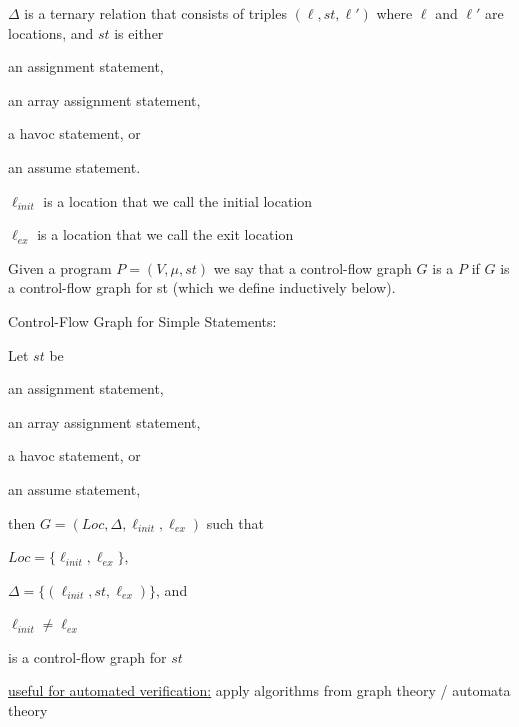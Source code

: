 \documentclass[landscape, a4paper]{article}
\begin{document}
\begin{minipage}[t]{0.2\linewidth}
\begin{betterlist}
\begin{betterlist}
			\item $\Delta$ is a ternary relation that consists of triples $(\ell , st, \ell ')$ where $\ell$ and $\ell'$  are locations, and $st$ is either
			\begin{betterlist}
				\item an assignment statement,
				\item an array assignment statement,
				\item a havoc statement, or
				\item an assume statement.
			\end{betterlist}
			\item $\ell_{init}$ is a location that we call the \alert{initial location}
			\item $\ell_{ex}$ is a location that we call the \alert{exit location}
		\end{betterlist}\color{black}
		\item Given a program $P = (V , \mu , st)$ we say that a control-flow graph $G$ is a  $P$ if $G$ is a control-flow graph for st (which we define inductively below). 
		\begin{betterlist}
			\item \alert{Control-Flow Graph for Simple Statements}:
			\begin{betterlist}
				\item Let $st$ be
				\begin{betterlist}
					\item an assignment statement,
					\item an array assignment statement,
					\item a havoc statement, or
					\item an assume statement,
				\end{betterlist}
				then $G = (Loc, \Delta , \ell_{init}, \ell_{ex})$ such that
				\begin{betterlist}
					\item $Loc = \{ \ell_{init}, \ell_{ex}\}$,
					\item $\Delta = \{ (\ell_{init}, st, \ell_{ex})\}$, and
					\item $\ell_{init} \ne  \ell_{ex}$
				\end{betterlist}
				is a control-flow graph for $st$
			\end{betterlist}
			\item \underline{useful for automated verification:} apply algorithms from graph theory / automata theory

\end{betterlist}
\end{betterlist}
\end{minipage}
\end{document}
